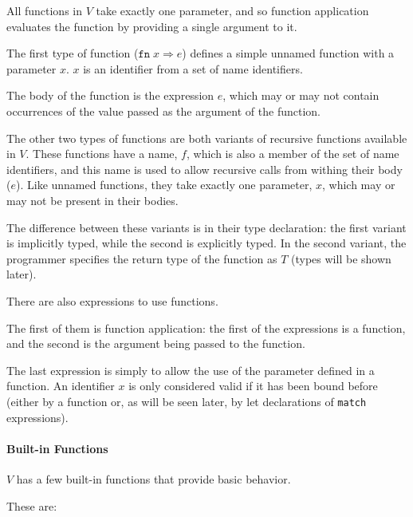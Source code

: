 \documentclass{article}
\begin{document}
All functions in $V$ take exactly one parameter, and so function application evaluates the function by providing a single argument to it.

The first type of function ($\texttt{fn} \; x \Rightarrow e$) defines a simple unnamed function with a parameter $x$.
$x$ is an identifier from a set of name identifiers.

The body of the function is the expression $e$, which may or may not contain occurrences of the value passed as the argument of the function.

\medskip

The other two types of functions are both variants of recursive functions available in $V$.
These functions have a name, $f$, which is also a member of the set of name identifiers, and this name is used to allow recursive calls from withing their body ($e$).
Like unnamed functions, they take exactly one parameter, $x$, which may or may not be present in their bodies.

The difference between these variants is in their type declaration: the first variant is implicitly typed, while the second is explicitly typed.
In the second variant, the programmer specifies the return type of the function as $T$ (types will be shown later).

\medskip

There are also expressions to use functions.

The first of them is function application: the first of the expressions is a function, and the second is the argument being passed to the function.

The last expression is simply to allow the use of the parameter defined in a function.
An identifier $x$ is only considered valid if it has been bound before (either by a function or, as will be seen later, by let declarations of \texttt{match} expressions).

\paragraph{Built-in Functions}

$V$ has a few built-in functions that provide basic behavior.

These are:

\medskip
\end{document}
